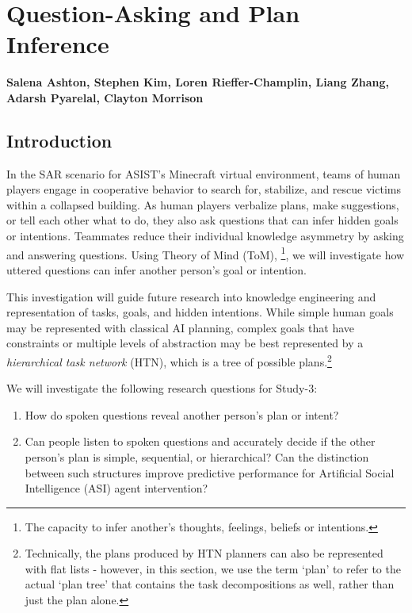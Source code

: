 \chapter{Question-Asking and Plan Inference}
\label{ch:question_plan}
\textbf{Salena Ashton, Stephen Kim, Loren Rieffer-Champlin, Liang Zhang,
Adarsh Pyarelal, Clayton Morrison}

\section{Introduction}

In the SAR scenario for ASIST's Minecraft virtual environment, teams of human
players engage in cooperative behavior to search for, stabilize, and rescue
victims within a collapsed building. As human players verbalize plans, make
suggestions, or tell each other what to do, they also ask questions that can
infer hidden goals or intentions. Teammates reduce their individual knowledge
asymmetry by asking and answering questions. Using Theory of Mind (ToM),
\footnote{The capacity to infer another's thoughts, feelings, beliefs or
intentions.}, we will investigate how uttered questions can infer another
person's goal or intention. 

This investigation will guide future research into knowledge engineering and
representation of tasks, goals, and hidden intentions. While simple human goals
may be represented with classical AI planning, complex goals that have
constraints or multiple levels of abstraction may be best represented by a
\emph{hierarchical task network} (HTN), which is a tree of possible
plans.\footnote{Technically, the plans produced by HTN planners can also be
    represented with flat lists - however, in this section, we use the term
`plan' to refer to the actual `plan tree' that contains the task decompositions
as well, rather than just the plan alone.}




We will investigate the following research questions for Study-3:

\begin{enumerate}
    \item How do spoken questions reveal another person’s plan or intent? 
    \item Can people listen to spoken questions and accurately decide if the other person's plan
        is simple, sequential, or hierarchical? Can the distinction between such
        structures improve predictive performance for Artificial Social
        Intelligence (ASI) agent intervention?
\end{enumerate}

